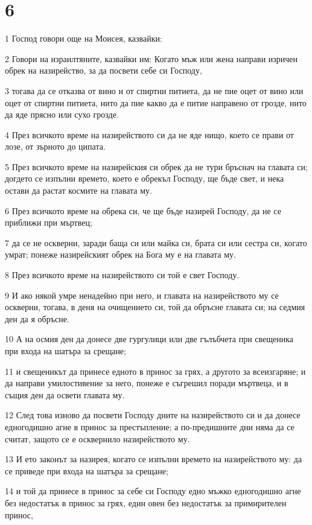 \chapter{6}

\par 1 Господ говори още на Моисея, казвайки:
\par 2 Говори на израилтяните, казвайки им: Когато мъж или жена направи изричен обрек на назирейство, за да посвети себе си Господу,
\par 3 тогава да се отказва от вино и от спиртни питиета, да не пие оцет от вино или оцет от спиртни питиета, нито да пие какво да е питие направено от грозде, нито да яде прясно или сухо грозде.
\par 4 През всичкото време на назирейството си да не яде нищо, което се прави от лозе, от зърното до ципата.
\par 5 През всичкото време на назирейския си обрек да не тури бръснач на главата си; догдето се изпълни времето, което е обрекъл Господу, ще бъде свет, и нека остави да растат космите на главата му.
\par 6 През всичкото време на обрека си, че ще бъде назирей Господу, да не се приближи при мъртвец;
\par 7 да се не оскверни, заради баща си или майка си, брата си или сестра си, когато умрат; понеже назирейският обрек на Бога му е на главата му.
\par 8 През всичкото време на назирейството си той е свет Господу.
\par 9 И ако някой умре ненадейно при него, и главата на назирейството му се оскверни, тогава, в деня на очищението си, той да обръсне главата си; на седмия ден да я обръсне.
\par 10 А на осмия ден да донесе две гургулици или две гълъбчета при свещеника при входа на шатъра за срещане;
\par 11 и свещеникът да принесе едното в принос за грях, а другото за всеизгаряне; и да направи умилостивение за него, понеже е съгрешил поради мъртвеца, и в същия ден да освети главата му.
\par 12 След това изново да посвети Господу дните на назирейството си и да донесе едногодишно агне в принос за престъпление; а по-предишните дни няма да се считат, защото се е осквернило назирейството му.
\par 13 И ето законът за назирея, когато се изпълни времето на назирейството му: да се приведе при входа на шатъра за срещане;
\par 14 и той да принесе в принос за себе си Господу едно мъжко едногодишно агне без недостатък в принос за грях, един овен без недостатък за примирителен принос,
